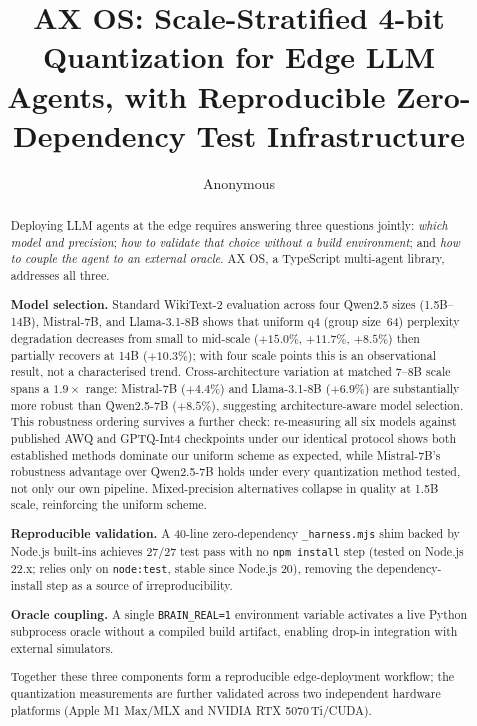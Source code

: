 \documentclass[10pt,twocolumn]{article}
\title{AX OS: Scale-Stratified 4-bit Quantization for Edge LLM Agents,
       with Reproducible Zero-Dependency Test Infrastructure}
\author{Anonymous}
\begin{document}
\maketitle

\begin{abstract}

Deploying LLM agents at the edge requires answering three questions jointly:
\emph{which model and precision}; \emph{how to validate that choice without a
build environment}; and \emph{how to couple the agent to an external oracle}.
AX OS, a TypeScript multi-agent library, addresses all three.

\textbf{Model selection.}
Standard WikiText-2 evaluation across four Qwen2.5 sizes (1.5B--14B),
Mistral-7B, and Llama-3.1-8B shows that uniform q4 (group size~64)
perplexity degradation decreases from small to mid-scale ($+15.0\%$,
$+11.7\%$, $+8.5\%$) then partially recovers at 14B ($+10.3\%$); with four
scale points this is an observational result, not a characterised trend.
Cross-architecture variation at matched 7--8B scale spans a $1.9\times$ range:
Mistral-7B ($+4.4\%$) and Llama-3.1-8B ($+6.9\%$) are substantially more
robust than Qwen2.5-7B ($+8.5\%$), suggesting architecture-aware model selection.
This robustness ordering survives a further check: re-measuring all six
models against published AWQ and GPTQ-Int4 checkpoints under our identical
protocol shows both established methods dominate our uniform scheme as
expected, while Mistral-7B's robustness advantage over Qwen2.5-7B holds under
every quantization method tested, not only our own pipeline.
Mixed-precision alternatives collapse in quality at 1.5B scale, reinforcing
the uniform scheme.

\textbf{Reproducible validation.}
A 40-line zero-dependency \texttt{\_harness.mjs} shim backed by Node.js
built-ins achieves 27/27 test pass with no \texttt{npm install} step (tested
on Node.js 22.x; relies only on \texttt{node:test}, stable since Node.js 20),
removing the dependency-install step as a source of irreproducibility.

\textbf{Oracle coupling.}
A single \texttt{BRAIN\_REAL=1} environment variable activates a live
Python subprocess oracle without a compiled build artifact, enabling
drop-in integration with external simulators.

Together these three components form a reproducible edge-deployment
workflow; the quantization measurements are further validated across two
independent hardware platforms (Apple M1 Max/MLX and NVIDIA RTX 5070\,Ti/CUDA).

\end{abstract}
\end{document}
